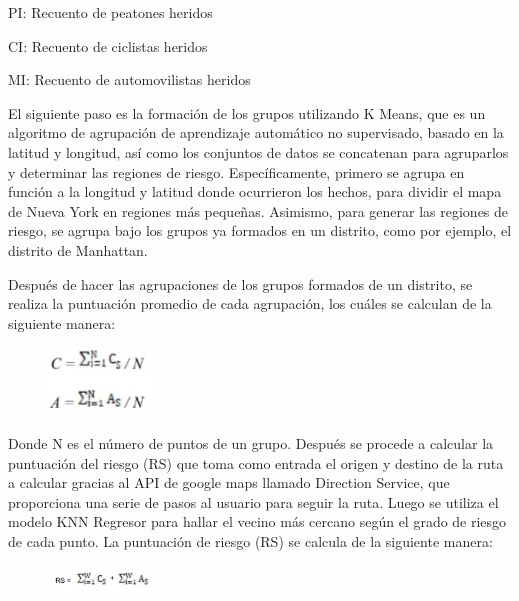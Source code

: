 PI: Recuento de peatones heridos

CI: Recuento de ciclistas heridos

MI: Recuento de automovilistas heridos

El siguiente paso es la formación de los grupos utilizando K Means, que es un algoritmo de agrupación de aprendizaje automático no supervisado, basado en la latitud y longitud, así como los conjuntos de datos se concatenan para agruparlos y determinar las regiones de riesgo. Específicamente, primero se agrupa en función a la longitud y latitud donde ocurrieron los hechos, para dividir el mapa de Nueva York en regiones más pequeñas. Asimismo, para generar las regiones de riesgo, se agrupa bajo los grupos ya formados en un distrito, como por ejemplo, el distrito de Manhattan. 

Después de hacer las agrupaciones de los grupos formados de un distrito, se realiza la puntuación promedio de cada agrupación, los cuáles se calculan de la siguiente manera:
\begin{figure}[h]
	\begin{center}
		\includegraphics[width=0.25\textwidth]{2/figures/agrupSafe.jpg}
	\end{center}
\end{figure}
Donde N es el número de puntos de un grupo. Después se procede a calcular la puntuación del riesgo (RS) que toma como entrada el origen y destino de la ruta a calcular gracias al API de google maps llamado Direction Service,  que proporciona una serie de pasos al usuario para seguir la ruta. Luego se utiliza el modelo KNN Regresor para hallar el vecino más cercano según el grado de riesgo de cada punto. La puntuación de riesgo (RS) se calcula de la siguiente manera: 

\begin{figure}[h]
	\begin{center}
		\includegraphics[width=0.25\textwidth]{2/figures/riesgoSafe.jpg}
	\end{center}
\end{figure}

